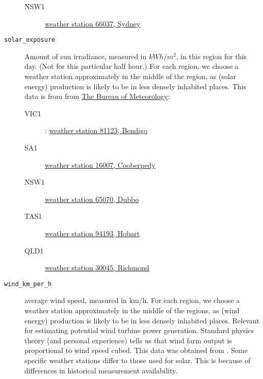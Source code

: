 \begin{description}
\begin{description}
        \item[NSW1] \href{https://reg.bom.gov.au/jsp/ncc/cdio/weatherData/av?p_nccObsCode=122&p_display_type=dailyDataFile&p_startYear=&p_c=&p_stn_num=66037}{weather station 66037, Sydney}
    \end{description}
    \item[\texttt{solar\_exposure}] Amount of sun irradiance, measured in $kWh/m^2$, in this region for this day. (Not for this particular half hour.) For each region, we choose a weather station approximately in the middle of the region, as (solar energy) production is likely to be in less densely inhabited places. This data is from from \href{https://reg.bom.gov.au/climate/data/}{The Bureau of Meteorology}:
    \begin{description}
        \item[VIC1]: \href{https://reg.bom.gov.au/jsp/ncc/cdio/weatherData/av?p_nccObsCode=193&p_display_type=dailyDataFile&p_startYear=&p_c=&p_stn_num=81123}{weather station 81123, Bendigo}
        \item[SA1] \href{https://reg.bom.gov.au/jsp/ncc/cdio/weatherData/av?p_nccObsCode=193&p_display_type=dailyDataFile&p_startYear=&p_c=&p_stn_num=16007}{weather station 16007, Cooberpedy}
        \item[NSW1] \href{https://reg.bom.gov.au/jsp/ncc/cdio/weatherData/av?p_nccObsCode=193&p_display_type=dailyDataFile&p_startYear=&p_c=&p_stn_num=65070}{weather station 65070, Dubbo}
        \item[TAS1] \href{https://reg.bom.gov.au/jsp/ncc/cdio/weatherData/av?p_nccObsCode=193&p_display_type=dailyDataFile&p_startYear=&p_c=&p_stn_num=94193}{weather station 94193, Hobart}
        \item[QLD1] \href{https://reg.bom.gov.au/jsp/ncc/cdio/weatherData/av?p_nccObsCode=193&p_display_type=dailyDataFile&p_startYear=&p_c=&p_stn_num=30045}{weather station 30045, Richmond}
    \end{description}
    \item[\texttt{wind\_km\_per\_h}] average wind speed, measured in km/h. For each region, we choose a weather station approximately in the middle of the regions, as (wind energy) production is likely to be in less densely inhabited places. Relevant for estimating potential wind turbine power generation. Standard physics theory (and personal experience) tells us that wind farm output is proportional to wind speed cubed. This data was obtained from \cite{willy_weather}. Some specific weather stations differ to those used for solar. This is because of differences in historical measurement availability.

\end{description}
